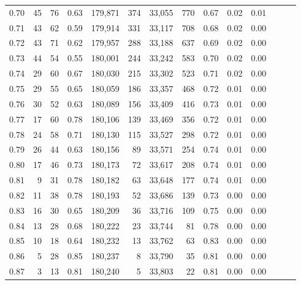 \begin{tabular}{rrrrrrrrrrrrrr}
0.70 &      45 &     76 &  0.63 &  179,871 &      374 &  33,055 &     770 &  0.67 &  0.02 &      0.01 \\
0.71 &      43 &     62 &  0.59 &  179,914 &      331 &  33,117 &     708 &  0.68 &  0.02 &      0.00 \\
0.72 &      43 &     71 &  0.62 &  179,957 &      288 &  33,188 &     637 &  0.69 &  0.02 &      0.00 \\
0.73 &      44 &     54 &  0.55 &  180,001 &      244 &  33,242 &     583 &  0.70 &  0.02 &      0.00 \\
0.74 &      29 &     60 &  0.67 &  180,030 &      215 &  33,302 &     523 &  0.71 &  0.02 &      0.00 \\
0.75 &      29 &     55 &  0.65 &  180,059 &      186 &  33,357 &     468 &  0.72 &  0.01 &      0.00 \\
0.76 &      30 &     52 &  0.63 &  180,089 &      156 &  33,409 &     416 &  0.73 &  0.01 &      0.00 \\
0.77 &      17 &     60 &  0.78 &  180,106 &      139 &  33,469 &     356 &  0.72 &  0.01 &      0.00 \\
0.78 &      24 &     58 &  0.71 &  180,130 &      115 &  33,527 &     298 &  0.72 &  0.01 &      0.00 \\
0.79 &      26 &     44 &  0.63 &  180,156 &       89 &  33,571 &     254 &  0.74 &  0.01 &      0.00 \\
0.80 &      17 &     46 &  0.73 &  180,173 &       72 &  33,617 &     208 &  0.74 &  0.01 &      0.00 \\
0.81 &       9 &     31 &  0.78 &  180,182 &       63 &  33,648 &     177 &  0.74 &  0.01 &      0.00 \\
0.82 &      11 &     38 &  0.78 &  180,193 &       52 &  33,686 &     139 &  0.73 &  0.00 &      0.00 \\
0.83 &      16 &     30 &  0.65 &  180,209 &       36 &  33,716 &     109 &  0.75 &  0.00 &      0.00 \\
0.84 &      13 &     28 &  0.68 &  180,222 &       23 &  33,744 &      81 &  0.78 &  0.00 &      0.00 \\
0.85 &      10 &     18 &  0.64 &  180,232 &       13 &  33,762 &      63 &  0.83 &  0.00 &      0.00 \\
0.86 &       5 &     28 &  0.85 &  180,237 &        8 &  33,790 &      35 &  0.81 &  0.00 &      0.00 \\
0.87 &       3 &     13 &  0.81 &  180,240 &        5 &  33,803 &      22 &  0.81 &  0.00 &      0.00 \\

\end{tabular}
